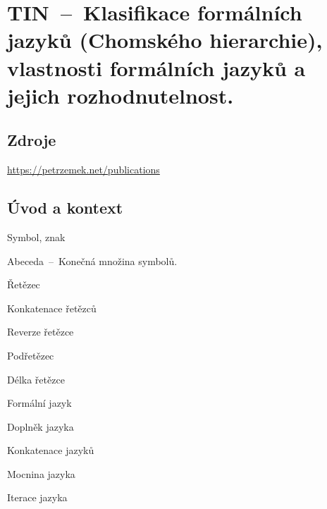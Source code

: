 

\graphicspath{{tin/klasifikace_jazyku/figures}}


\chapter{TIN~--~Klasifikace formálních jazyků (Chomského hierarchie), vlastnosti formálních jazyků a jejich rozhodnutelnost.}



\section{Zdroje}

\begin{compactitem}
    \item {}
    \item {}
    \item {}
    \item {}
    \item {}
    \item \url{https://petrzemek.net/publications}
\end{compactitem}


\section{Úvod a kontext}

\begin{compactitem}
    \item Symbol, znak
    \item Abeceda~--~Konečná množina symbolů.
    \item Řetězec
    \item Konkatenace řetězců
    \item Reverze řetězce
    \item Podřetězec
    \item Délka řetězce
    \item Formální jazyk
    \item Doplněk jazyka
    \item Konkatenace jazyků
    \item Mocnina jazyka
    \item Iterace jazyka
\end{compactitem}

